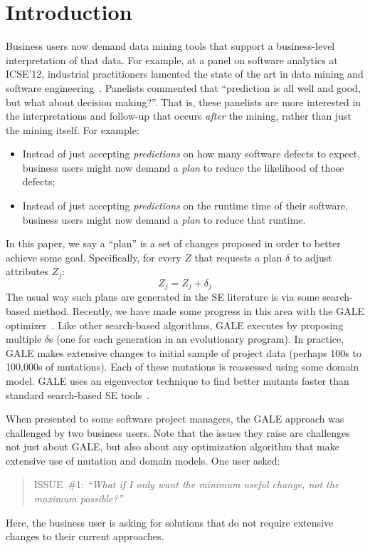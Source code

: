\documentclass[conference]{IEEEtran}
\newcommand{\bi}{\begin{itemize}}
\newcommand{\ei}{\end{itemize}}
\begin{document}
\section{Introduction}
Business  users   now demand   data mining tools
that  support a  business-level
interpretation of that data. For example,
at a  panel on software analytics at ICSE'12,
industrial practitioners lamented the state of the art in data mining
and software engineering~\cite{menzies12a}. Panelists commented that
``prediction is all well and good, but what about decision
making?''. That is, these panelists are more interested in the interpretations
and follow-up
that occurs {\em after} the mining, rather than just  the mining itself. For example:
\bi
\item 
Instead of just accepting  {\em predictions} on how many 
 software defects
to expect,  business users might now demand a {\em plan} to
reduce the likelihood of those defects;
\item Instead of just accepting {\em predictions} on the runtime
time of their software, business users might now demand
a {\em plan} to reduce that runtime.
\ei
In this paper, we say   a ``plan'' is a  set of changes
proposed  in order to better achieve some goal. 
Specifically, for every $Z$  that requests a plan $\delta$ to
  adjust   attributes $Z_j$:
\begin{equation}\label{eq:one}
Z_j = Z_j + \delta_j
\end{equation}
The usual way such plans are generated in the SE literature
is via some search-based method. Recently, we have made  some progress
in this area with the  GALE optimizer~\cite{krall14}. 
Like other search-based algorithms,
 GALE executes by proposing multiple $\delta$s
 (one for each generation in an evolutionary program).
 In practice, GALE makes
 extensive changes to initial sample of project data
 (perhaps 
100s to 100,000s of mutations). Each of these mutations
is reassessed using some domain model.
GALE uses an eigenvector technique to find better mutants faster than standard search-based SE tools~\cite{deb00a,zit02}.

When presented to some  software project managers, the GALE approach was challenged by
two business users. Note that the   issues they raise are
challenges not just  about GALE, but also  about any     optimization algorithm  that  
 make extensive use of mutation  and domain models.
One  user asked:
\begin{quote}
ISSUE~\#1: {\em ``What if I only want the minimum useful change, not
the maximum possible?''}
\end{quote}
Here, the business user is asking for solutions  that do not require extensive 
changes to their current  approaches. 
\end{document}
